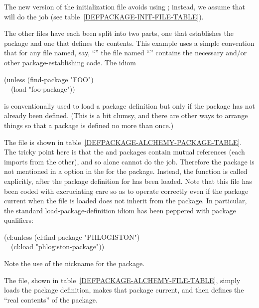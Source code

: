 \begin{new}
The new version of the initialization file avoids using ;
instead, we assume that  will do the job
(see table~\ref{DEFPACKAGE-INIT-FILE-TABLE}).

The other files have each been split into two parts, one that
establishes the package and one that defines the contents.
This example uses a simple convention that for any file
named, say, ``'' the file named ``''
contains the necessary  and/or other package-establishing
code.  The idiom
\begin{lisp}
(unless (find-package "FOO") \\
~~(load "foo-package"))
\end{lisp}
is conventionally used to load a package definition but only if the package
has not already been defined.  (This is a bit clumsy, and there are other
ways to arrange things so that a package is defined no more than once.)

The file  is shown in
table~\ref{DEFPACKAGE-ALCHEMY-PACKAGE-TABLE}.
The tricky point here is that the  and 
packages contain mutual references (each imports from the other),
and so  alone cannot do the job.  Therefore
the  package is not mentioned in a  option
in the  for the  package.  Instead,
the function  is called explicitly, after the package definition
for  has been loaded.  Note that this file has
been coded with excruciating care so as to operate correctly even if
the package current when the file is loaded does not inherit from
the  package. In particular, the standard load-package-definition
idiom has been peppered with package qualifiers:
\begin{lisp}
(cl:unless (cl:find-package "PHLOGISTON") \\
~~(cl:load "phlogiston-package"))
\end{lisp}
Note the use of the nickname  for the  package.

The  file, shown in table~\ref{DEFPACKAGE-ALCHEMY-FILE-TABLE},
simply loads the  package definition,
makes that package current, and then defines the ``real contents''
of the package.
\end{new}
